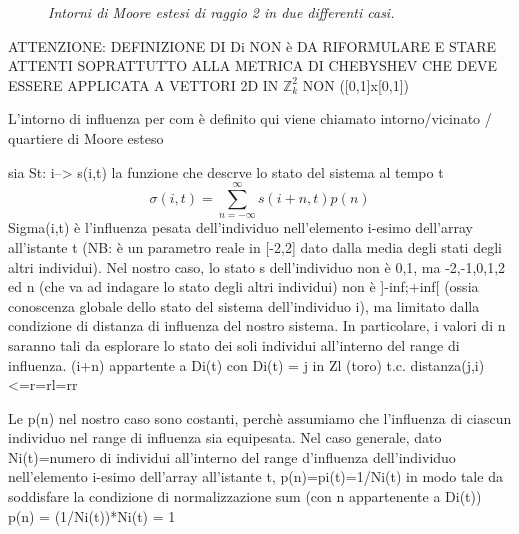 \documentclass{article}
\newcommand{\Zii}{$\mathbb{Z}^2_k$ }
\begin{document}
\begin{figure}[h]
\centering
{}
\caption{\textit{Intorni di Moore estesi di raggio 2 in due differenti casi.}}
\label{fig:1}
\end{figure}

ATTENZIONE: DEFINIZIONE DI Di NON è DA RIFORMULARE E STARE ATTENTI SOPRATTUTTO ALLA METRICA DI CHEBYSHEV CHE DEVE ESSERE APPLICATA A VETTORI 2D IN \Zii NON ([0,1]x[0,1])

L’intorno di influenza per com è definito qui viene chiamato intorno/vicinato / quartiere di Moore esteso

sia St: i--> s(i,t) la funzione che descrve lo stato del sistema al tempo t
\begin{equation}
    \sigma(i,t) = \sum_{n=-\infty}^\infty s(i+n, t)p(n)
    \label{Eq:1}
\end{equation}
Sigma(i,t) è l'influenza pesata dell'individuo nell'elemento i-esimo dell'array all'istante t (NB: è un parametro reale in [-2,2] dato dalla media degli stati degli altri individui).
Nel nostro caso, lo stato s dell'individuo non è {0,1}, ma {-2,-1,0,1,2} ed n (che va ad indagare lo stato degli altri individui) non è ]-inf;+inf[ (ossia conoscenza globale dello stato del sistema dell'individuo i), ma limitato dalla condizione di distanza di influenza del nostro sistema.
In particolare, i valori di n saranno tali da esplorare lo stato dei soli individui all'interno del range di influenza.
(i+n) appartente a Di(t)
con Di(t) = {j in Zl (toro) t.c. distanza(j,i)<=r=rl=rr} %

Le p(n) nel nostro caso sono costanti, perchè assumiamo che l'influenza di ciascun individuo nel range di influenza sia equipesata.
Nel caso generale, dato Ni(t)=numero di individui all'interno del range d'influenza dell'individuo nell'elemento i-esimo dell'array all'istante t,
p(n)=pi(t)=1/Ni(t)
in modo tale da soddisfare la condizione di normalizzazione
sum (con n appartenente a Di(t)) p(n) = (1/Ni(t))*Ni(t) = 1
\end{document}
